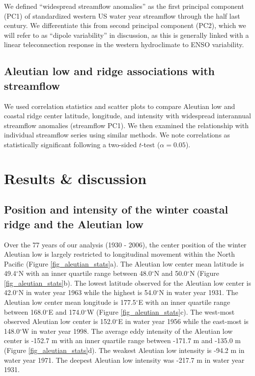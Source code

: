 \documentclass[final, double]{ua-thesis}
\begin{document}
We defined ``widespread streamflow anomalies'' as the first principal component (PC1) of standardized western US water year streamflow through the half last century. We differentiate this from second principal component (PC2), which we will refer to as ``dipole variability'' in discussion, as this is generally linked with a linear teleconnection response in the western hydroclimate to ENSO variability.

\subsection{Aleutian low and ridge associations with streamflow}

We used correlation statistics and scatter plots to compare Aleutian low and coastal ridge center latitude, longitude, and intensity with widespread interannual streamflow anomalies (streamflow PC1). We then examined the relationship with individual streamflow series using similar methods. We note correlations as statistically significant following a two-sided $t$-test ($\alpha = 0.05$).

\section{Results \& discussion}

\subsection{Position and intensity of the winter coastal ridge and the Aleutian low}

Over the 77 years of our analysis (1930 - 2006), the center position of the winter Aleutian low is largely restricted to longitudinal movement within the North Pacific (Figure \ref{fig_aleutian_stats}a). The Aleutian low center mean latitude is 49.4$^{\circ}$N with an inner quartile range between 48.0$^{\circ}$N and 50.0$^{\circ}$N (Figure \ref{fig_aleutian_stats}b). The lowest latitude observed for the Aleutian low center is 42.0$^{\circ}$N in water year 1963 while the highest is 54.0$^{\circ}$N in water year 1931. The Aleutian low center mean longitude is 177.5$^{\circ}$E with an inner quartile range between 168.0$^{\circ}$E and 174.0$^{\circ}$W (Figure \ref{fig_aleutian_stats}c). The west-most observed Aleutian low center is 152.0$^{\circ}$E in water year 1956 while the east-most is 148.0$^{\circ}$W in water year 1998. The average eddy intensity of the Aleutian low center is -152.7 m with an inner quartile range between -171.7 m and -135.0 m (Figure \ref{fig_aleutian_stats}d). The weakest Aleutian low intensity is -94.2 m in water year 1971. The deepest Aleutian low intensity was -217.7 m in water year 1931.
\end{document}
